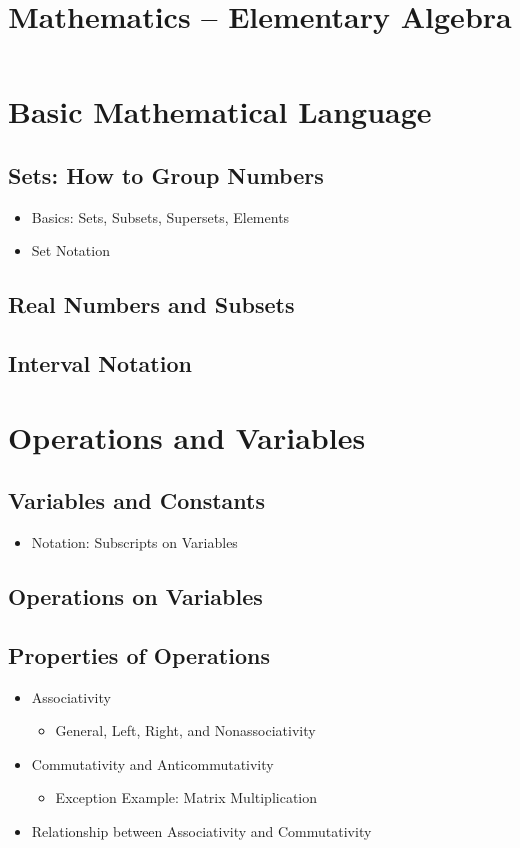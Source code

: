 \documentclass[11pt]{article}
\title{Mathematics -- Elementary Algebra}
\author{}
\date{}
\begin{document}
\maketitle


\setcounter{section}{0}
\section{Basic Mathematical Language}
\subsection{Sets: How to Group Numbers}
\begin{itemize}
    \item Basics: Sets, Subsets, Supersets, Elements
    \item Set Notation
\end{itemize}
\subsection{Real Numbers and Subsets}
\subsection{Interval Notation}

\setcounter{section}{1}
\section{Operations and Variables}
\subsection{Variables and Constants}
\begin{itemize}
    \item Notation: Subscripts on Variables
\end{itemize}
\subsection{Operations on Variables}
\subsection{Properties of Operations}
\begin{itemize}
    \item Associativity
    \begin{itemize}
        \item General, Left, Right, and Nonassociativity
    \end{itemize}
    \item Commutativity and Anticommutativity
    \begin{itemize}
        \item Exception Example: Matrix Multiplication
    \end{itemize}
    \item Relationship between Associativity and Commutativity
\end{itemize}
\end{document}
